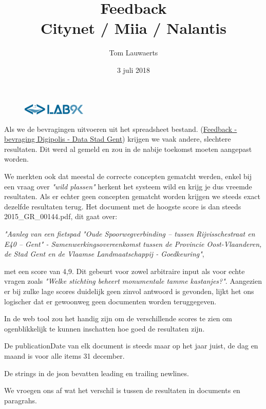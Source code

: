 \documentclass[11pt, letterpaper, oneside]{article}
\title{Feedback \\ Citynet / Miia / Nalantis}
\author{Tom Lauwaerts}
\date{3 juli 2018}
\begin{document}
	\begin{figure}
			\includegraphics[width=0.27\textwidth,keepaspectratio]{figuren/logo} %
	\end{figure}
	\vspace*{0.35cm}
	
	\noindent
	\fontsize{30pt}{28pt}\selectfont\textcolor{priColour}{\textbf{\@title}}\newline
	
	\fontsize{11pt}{15pt}\selectfont
	Als we de bevragingen uitvoeren uit het spreadsheet bestand. (\href{https://docs.google.com/spreadsheets/d/1eH3B7dC7MSjM5RJHtsiqMeepdzvHi-di5VJLD1ZBV-s/edit#gid=967764322}{Feedback - bevraging Digipolis - Data Stad Gent}) krijgen we vaak andere, slechtere resultaten. Dit werd al gemeld en zou in de nabije toekomst moeten aangepast worden.
	
	We merkten ook dat meestal de correcte concepten gematcht werden, enkel bij een vraag over \textit{"wild plassen"} herkent het systeem wild en krijg je dus vreemde resultaten. Als er echter geen concepten gematcht worden krijgen we steeds exact dezelfde resultaten terug. Het document met de hoogste score is dan steeds 2015\_GR\_00144.pdf, dit gaat over:
	
	\medskip
	\textit{"Aanleg van een fietspad "Oude Spoorwegverbinding – tussen Rijvisschestraat en E40 – Gent" - Samenwerkingsovereenkomst tussen de Provincie Oost-Vlaanderen, de Stad Gent en de Vlaamse Landmaatschappij - Goedkeuring"},
	\medskip
	
	met een score van 4,9. Dit gebeurt voor zowel arbitraire input als voor echte vragen zoals \textit{"Welke stichting beheert monumentale tamme kastanjes?"}. Aangezien er bij zulke lage scores duidelijk geen zinvol antwoord is gevonden, lijkt het ons logischer dat er gewoonweg geen documenten worden teruggegeven.
	
	In de web tool zou het handig zijn om de verschillende scores te zien om ogenblikkelijk te kunnen inschatten hoe goed de resultaten zijn.
	
	De publicationDate van elk document is steeds maar op het jaar juist, de dag en maand is voor alle items 31 december.
	
	De strings in de json bevatten leading en trailing newlines.
	
	We vroegen ons af wat het verschil is tussen de resultaten in documents en paragrahs.
\end{document}
